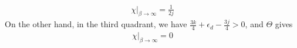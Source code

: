\documentclass[12pt,twoside]{article}
\numberwithin{equation}{section}
\begin{document}
\begin{equation}\begin{aligned}
	\chi\vert_{\beta \to \infty} = \frac{1}{2j}
\end{aligned}\end{equation}
On the other hand, in the third quadrant, we have \(\frac{3k}{4} + \epsilon_d - \frac{3j}{4} > 0\), and \(\Theta\) gives
\begin{equation}\begin{aligned}
	\chi\vert_{\beta \to \infty} = 0
\end{aligned}\end{equation}
\end{document}
